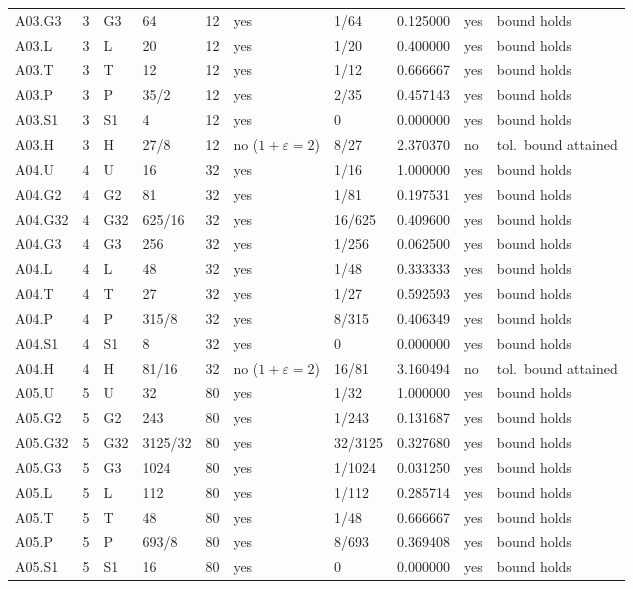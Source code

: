 {\begin{longtable}{@{}llllrlllll@{}}
A03.G3 & 3 & G3 & 64 & 12 & yes & 1/64 & 0.125000 & yes & bound holds \\
A03.L & 3 & L & 20 & 12 & yes & 1/20 & 0.400000 & yes & bound holds \\
A03.T & 3 & T & 12 & 12 & yes & 1/12 & 0.666667 & yes & bound holds \\
A03.P & 3 & P & 35/2 & 12 & yes & 2/35 & 0.457143 & yes & bound holds \\
A03.S1 & 3 & S1 & 4 & 12 & yes & 0 & 0.000000 & yes & bound holds \\
A03.H & 3 & H & 27/8 & 12 & no ($1{+}\varepsilon=2$) & 8/27 & 2.370370 & no & tol.\ bound attained \\
A04.U & 4 & U & 16 & 32 & yes & 1/16 & 1.000000 & yes & bound holds \\
A04.G2 & 4 & G2 & 81 & 32 & yes & 1/81 & 0.197531 & yes & bound holds \\
A04.G32 & 4 & G32 & 625/16 & 32 & yes & 16/625 & 0.409600 & yes & bound holds \\
A04.G3 & 4 & G3 & 256 & 32 & yes & 1/256 & 0.062500 & yes & bound holds \\
A04.L & 4 & L & 48 & 32 & yes & 1/48 & 0.333333 & yes & bound holds \\
A04.T & 4 & T & 27 & 32 & yes & 1/27 & 0.592593 & yes & bound holds \\
A04.P & 4 & P & 315/8 & 32 & yes & 8/315 & 0.406349 & yes & bound holds \\
A04.S1 & 4 & S1 & 8 & 32 & yes & 0 & 0.000000 & yes & bound holds \\
A04.H & 4 & H & 81/16 & 32 & no ($1{+}\varepsilon=2$) & 16/81 & 3.160494 & no & tol.\ bound attained \\
A05.U & 5 & U & 32 & 80 & yes & 1/32 & 1.000000 & yes & bound holds \\
A05.G2 & 5 & G2 & 243 & 80 & yes & 1/243 & 0.131687 & yes & bound holds \\
A05.G32 & 5 & G32 & 3125/32 & 80 & yes & 32/3125 & 0.327680 & yes & bound holds \\
A05.G3 & 5 & G3 & 1024 & 80 & yes & 1/1024 & 0.031250 & yes & bound holds \\
A05.L & 5 & L & 112 & 80 & yes & 1/112 & 0.285714 & yes & bound holds \\
A05.T & 5 & T & 48 & 80 & yes & 1/48 & 0.666667 & yes & bound holds \\
A05.P & 5 & P & 693/8 & 80 & yes & 8/693 & 0.369408 & yes & bound holds \\
A05.S1 & 5 & S1 & 16 & 80 & yes & 0 & 0.000000 & yes & bound holds \\

\end{longtable}}
